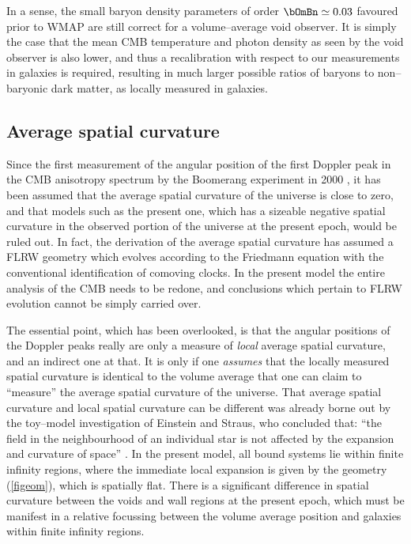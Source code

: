 \documentclass[12pt]{iopart}
\begin{document}
In a sense, the small baryon density parameters of order $\bOmBn\simeq0.03$
favoured prior to WMAP are still correct for a volume--average
void observer. It is simply the case that the mean CMB temperature and
photon density as seen by the void observer is also lower, and thus a
recalibration with respect to our measurements in galaxies is required,
resulting in much larger possible ratios of baryons to non--baryonic dark
matter, as locally measured in galaxies.

\subsection{Average spatial curvature\label{curve}}

Since the first measurement of the angular position of the first Doppler
peak in the CMB anisotropy spectrum by the Boomerang experiment in 2000
\cite{boom}, it has been assumed that the average spatial curvature of the
universe is close to zero, and that models such as the present one, which has
a sizeable negative spatial curvature in the observed portion of the universe
at the present epoch, would be ruled out. In fact, the derivation of the
average spatial curvature has assumed a FLRW geometry which evolves
according to the Friedmann equation with the conventional identification
of comoving clocks. In the present model the entire
analysis of the CMB needs to be redone, and conclusions which pertain to
FLRW evolution cannot be simply carried over.

The essential point, which has been overlooked, is that the angular positions
of the Doppler peaks really are only a measure of {\em local}
average spatial curvature, and an indirect one at that. It is only if
one {\em assumes} that the locally measured spatial curvature is identical to
the volume average that one can claim to ``measure'' the average spatial
curvature of the universe. That average spatial curvature and local
spatial curvature can be different was already borne out by the
toy--model investigation of Einstein and Straus, who concluded
that: ``the field in the neighbourhood of an individual star
is not affected by the expansion and curvature of space'' \cite{gruyere}.
In the present model, all bound systems lie
within finite infinity regions, where the immediate local expansion is
given by the geometry (\ref{figeom}), which is spatially flat. There is
a significant difference in spatial curvature between the voids and
wall regions at the present epoch, which must be manifest in a relative
focussing between the volume average position and galaxies within finite
infinity regions.
\end{document}
